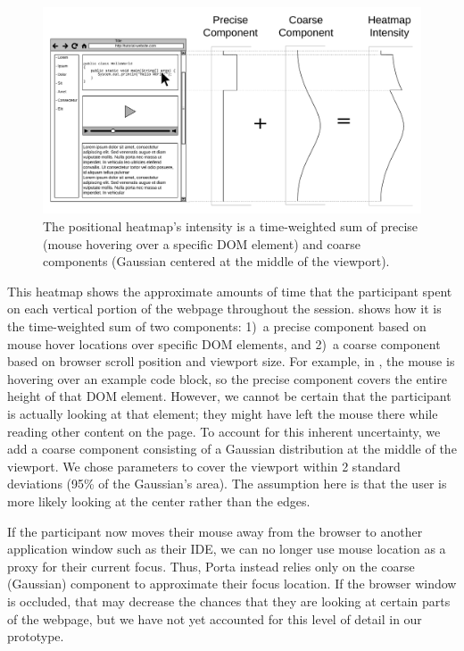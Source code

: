 \begin{figure}
  \centering
  \includegraphics[width=0.9\columnwidth]{figures/porta/heatmap}

\vspace{-0.75em}

  \caption{The positional heatmap's intensity is a time-weighted sum of
  precise (mouse hovering over a specific DOM element) and coarse
  components (Gaussian centered at the middle of the viewport).}

  \label{fig:pos-heatmap}
  \vspace{-0.5em} %
\end{figure}


This heatmap shows the approximate amounts of time that the participant
spent on each vertical portion of the webpage throughout the session.
 shows how it is the time-weighted sum of two
components: 1)~a precise component based on mouse hover locations over
specific DOM elements, and 2)~a coarse component based on browser scroll
position and viewport size. For example, in , the
mouse is hovering over an example code block, so the precise component
covers the entire height of that DOM element. However, we cannot be
certain that the participant is actually looking at that element; they
might have left the mouse there while reading other content on the page.
To account for this inherent uncertainty, we add a coarse component
consisting of a Gaussian distribution at the middle of the viewport. We
chose parameters to cover the viewport within 2 standard deviations
(95\% of the Gaussian's area). The assumption here is that the user is
more likely looking at the center rather than the edges.


If the participant now moves their mouse away from the browser to
another application window such as their IDE, we can no longer use mouse
location as a proxy for their current focus. Thus, Porta instead relies
only on the coarse (Gaussian) component to approximate their focus
location.
%
If the browser window is occluded, that may decrease the chances that
they are looking at certain parts of the webpage, but we have not yet
accounted for this level of detail in our prototype.

